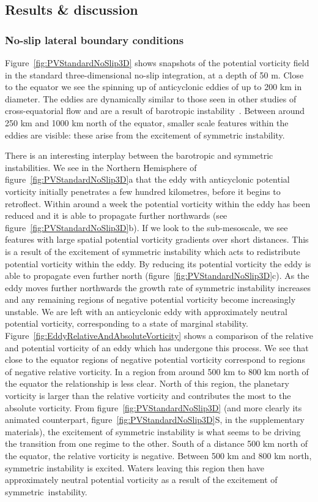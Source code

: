 \subsection{Results \& discussion}
\label{subsec:3DResults}
\subsubsection{No-slip lateral boundary conditions}
Figure~\ref{fig:PVStandardNoSlip3D} shows snapshots of the potential vorticity field in the standard three-dimensional no-slip integration, at a depth of 50 m. Close to the equator we see the spinning up of anticyclonic eddies of up to 200 km in diameter. The eddies are dynamically similar to those seen in other studies of cross-equatorial flow and are a result of barotropic instability~\citep[e.g.][]{Edwards1998I, Edwards1998II, Jochum2003, Goes2009}. Between around 250 km and 1000 km north of the equator, smaller scale features within the eddies are visible: these arise from the excitement of symmetric instability.

There is an interesting interplay between the barotropic and symmetric instabilities. We see in the Northern Hemisphere of figure~\ref{fig:PVStandardNoSlip3D}a that the eddy with anticyclonic potential vorticity initially penetrates a few hundred kilometres, before it begins to retroflect. Within around a week the potential vorticity within the eddy has been reduced and it is able to propagate further northwards (see figure~\ref{fig:PVStandardNoSlip3D}b). If we look to the sub-mesoscale, we see  features with large spatial potential vorticity gradients over short distances. This is a result of the excitement of  symmetric instability which acts to redistribute potential vorticity within the eddy. By reducing its potential vorticity the eddy is able to propagate even further north (figure~\ref{fig:PVStandardNoSlip3D}c). As the eddy moves further northwards the growth rate of symmetric instability increases and any remaining regions of negative potential vorticity become increasingly unstable. We are left with an anticyclonic eddy with approximately neutral potential vorticity, corresponding to a state of marginal stability. Figure~\ref{fig:EddyRelativeAndAbsoluteVorticity} shows a comparison of the relative and potential vorticity of an eddy which has undergone this process. We see that close to the equator regions of negative potential vorticity correspond to regions of negative relative vorticity. In a region from around 500 km to 800 km north of the equator the relationship is less clear. North of this region, the planetary vorticity is larger than the relative vorticity and contributes the most to the absolute vorticity. From figure~\ref{fig:PVStandardNoSlip3D} (and more clearly its animated counterpart, figure~\ref{fig:PVStandardNoSlip3D}S, in the supplementary materials), the excitement of symmetric instability is what seems to be driving the transition from one regime to the other. South of a distance 500 km north of the equator, the relative vorticity is negative. Between 500 km and 800 km north, symmetric instability is excited. Waters leaving this region then have approximately neutral potential vorticity as a result of the excitement of symmetric\ instability.


